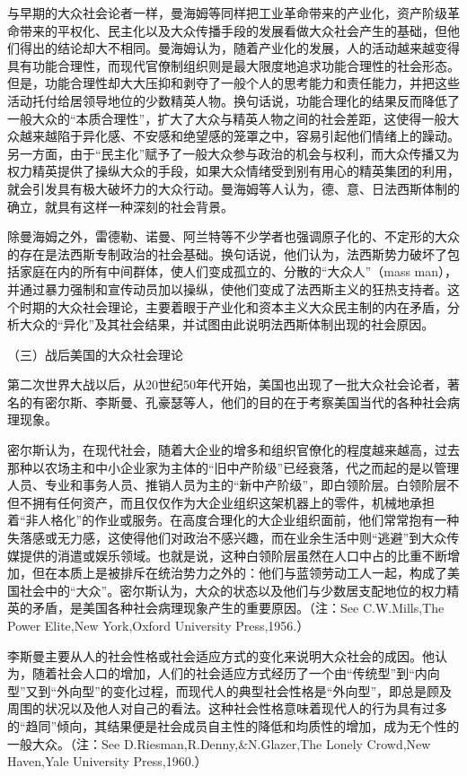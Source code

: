 \documentclass[UTF8,12pt]{ctexart}
\numberwithin{equation}{section} %
\numberwithin{figure}{section}
\numberwithin{table}{section}
\begin{document}
	与早期的大众社会论者一样，曼海姆等同样把工业革命带来的产业化，资产阶级革命带来的平权化、民主化以及大众传播手段的发展看做大众社会产生的基础，但他们得出的结论却大不相同。曼海姆认为，随着产业化的发展，人的活动越来越变得具有功能合理性，而现代官僚制组织则是最大限度地追求功能合理性的社会形态。但是，功能合理性却大大压抑和剥夺了一般个人的思考能力和责任能力，并把这些活动托付给居领导地位的少数精英人物。换句话说，功能合理化的结果反而降低了一般大众的“本质合理性”，扩大了大众与精英人物之间的社会差距，这使得一般大众越来越陷于异化感、不安感和绝望感的笼罩之中，容易引起他们情绪上的躁动。另一方面，由于“民主化”赋予了一般大众参与政治的机会与权利，而大众传播又为权力精英提供了操纵大众的手段，如果大众情绪受到别有用心的精英集团的利用，就会引发具有极大破坏力的大众行动。曼海姆等人认为，德、意、日法西斯体制的确立，就具有这样一种深刻的社会背景。
	
	除曼海姆之外，雷德勒、诺曼、阿兰特等不少学者也强调原子化的、不定形的大众的存在是法西斯专制政治的社会基础。换句话说，他们认为，法西斯势力破坏了包括家庭在内的所有中间群体，使人们变成孤立的、分散的“大众人”（mass man），并通过暴力强制和宣传动员加以操纵，使他们变成了法西斯主义的狂热支持者。这个时期的大众社会理论，主要着眼于产业化和资本主义大众民主制的内在矛盾，分析大众的“异化”及其社会结果，并试图由此说明法西斯体制出现的社会原因。
	
	（三）战后美国的大众社会理论
	
	第二次世界大战以后，从20世纪50年代开始，美国也出现了一批大众社会论者，著名的有密尔斯、李斯曼、孔豪瑟等人，他们的目的在于考察美国当代的各种社会病理现象。
	
	密尔斯认为，在现代社会，随着大企业的增多和组织官僚化的程度越来越高，过去那种以农场主和中小企业家为主体的“旧中产阶级”已经衰落，代之而起的是以管理人员、专业和事务人员、推销人员为主的“新中产阶级”，即白领阶层。白领阶层不但不拥有任何资产，而且仅仅作为大企业组织这架机器上的零件，机械地承担着“非人格化”的作业或服务。在高度合理化的大企业组织面前，他们常常抱有一种失落感或无力感，这使得他们对政治不感兴趣，而在业余生活中则“逃避”到大众传媒提供的消遣或娱乐领域。也就是说，这种白领阶层虽然在人口中占的比重不断增加，但在本质上是被排斥在统治势力之外的：他们与蓝领劳动工人一起，构成了美国社会中的“大众”。密尔斯认为，大众的状态以及他们与少数居支配地位的权力精英的矛盾，是美国各种社会病理现象产生的重要原因。（注：See C.W.Mills,The Power Elite,New York,Oxford University Press,1956.）
	
	李斯曼主要从人的社会性格或社会适应方式的变化来说明大众社会的成因。他认为，随着社会人口的增加，人们的社会适应方式经历了一个由“传统型”到“内向型”又到“外向型”的变化过程，而现代人的典型社会性格是“外向型”，即总是顾及周围的状况以及他人对自己的看法。这种社会性格意味着现代人的行为具有过多的“趋同”倾向，其结果便是社会成员自主性的降低和均质性的增加，成为无个性的一般大众。（注：See D.Riesman,R.Denny,\&N.Glazer,The Lonely Crowd,New Haven,Yale University Press,1960.）
	
\end{document}
